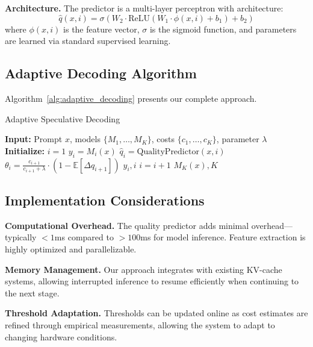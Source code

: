 \documentclass{article}
\theoremstyle{plain}
\theoremstyle{definition}
\theoremstyle{remark}
\begin{document}
\textbf{Architecture.} The predictor is a multi-layer perceptron with architecture:
\begin{equation}
\hat{q}(x, i) = \sigma\left(W_2 \cdot \text{ReLU}(W_1 \cdot \phi(x, i) + b_1) + b_2\right)
\end{equation}
where $\phi(x, i)$ is the feature vector, $\sigma$ is the sigmoid function, and parameters are learned via standard supervised learning.

\subsection{Adaptive Decoding Algorithm}

Algorithm~\ref{alg:adaptive_decoding} presents our complete approach.

\begin{algorithm}[t]
\caption{Adaptive Speculative Decoding}
\label{alg:adaptive_decoding}
\begin{algorithmic}[1]
\STATE \textbf{Input:} Prompt $x$, models $\{M_1, \ldots, M_K\}$, costs $\{c_1, \ldots, c_K\}$, parameter $\lambda$
\STATE \textbf{Initialize:} $i = 1$
    \STATE $y_i = M_i(x)$ 
    \STATE $\hat{q}_i = \text{QualityPredictor}(x, i)$ 
    \STATE $\theta_i = \frac{c_{i+1}}{c_{i+1} + \lambda} \cdot (1 - \mathbb{E}[\Delta q_{i+1}])$ 
        \RETURN $y_i, i$ 
    \ENDIF
    \STATE $i = i + 1$
\ENDWHILE
\RETURN $M_K(x), K$ 
\end{algorithmic}
\end{algorithm}

\subsection{Implementation Considerations}

\textbf{Computational Overhead.} The quality predictor adds minimal overhead—typically $<1$ms compared to $>100$ms for model inference. Feature extraction is highly optimized and parallelizable.

\textbf{Memory Management.} Our approach integrates with existing KV-cache systems, allowing interrupted inference to resume efficiently when continuing to the next stage.

\textbf{Threshold Adaptation.} Thresholds can be updated online as cost estimates are refined through empirical measurements, allowing the system to adapt to changing hardware conditions.
\end{document}
